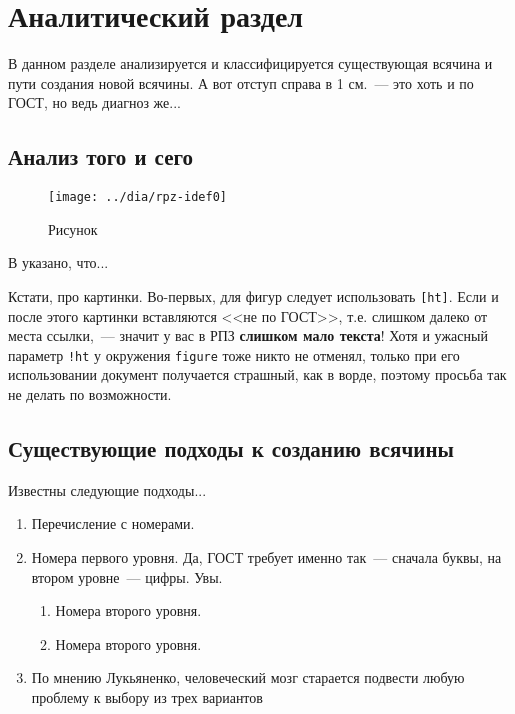 \chapter{Аналитический раздел}
\label{cha:analysis}
%
%
В данном разделе анализируется и классифицируется существующая всячина и пути создания новой всячины. А вот отступ справа в 1 см.~--- это хоть и по ГОСТ, но ведь диагноз же...

\section{Анализ того и сего}

\begin{figure}
  \centering
  \texttt{[image: ../dia/rpz-idef0]}
  \caption{Рисунок}
  \label{fig:fig01}
\end{figure}

В \cite{Pup09} указано, что...

Кстати, про картинки. Во-первых, для фигур следует использовать \texttt{[ht]}. Если и после этого картинки вставляются <<не по ГОСТ>>, т.е. слишком далеко от места ссылки,~--- значит у вас в РПЗ \textbf{слишком мало текста}! Хотя и ужасный параметр \texttt{!ht} у окружения \texttt{figure} тоже никто не отменял, только при его использовании документ получается страшный, как в ворде, поэтому просьба так не делать по возможности.

\section{Существующие подходы к созданию всячины}

Известны следующие подходы...

\begin{enumerate}
\item Перечисление с номерами.
\item Номера первого уровня. Да, ГОСТ требует именно так~--- сначала буквы, на втором уровне~--- цифры. Увы.
\begin{enumerate}
\item Номера второго уровня.
\item Номера второго уровня.
\end{enumerate}
\item По мнению Лукьяненко, человеческий мозг старается подвести любую проблему к выбору
  из трех вариантов
\end{enumerate}

